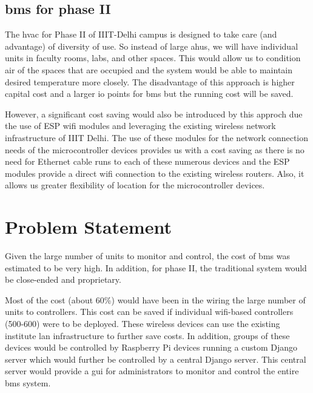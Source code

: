 \documentclass[letterpaper,11pt]{report}
\begin{document}
\section{\ac{bms} for phase II}
The \ac{hvac} for Phase II of IIIT-Delhi campus is designed to take care (and advantage) of diversity of use. So instead of large \ac{ahu}s, we will have individual units in faculty rooms, labs, and other spaces. This would allow us to condition air of the spaces that are occupied and the system would be able to maintain desired temperature more closely. The disadvantage of this approach is higher capital cost and a larger \ac{io} points for \ac{bms} but the running cost will be saved.
\par
However, a significant cost saving would also be introduced by this approch due the use of ESP \ac{wifi} modules and leveraging the existing wireless network infrastructure of IIIT Delhi. The use of these modules for the network connection needs of the microcontroller devices provides us with a cost saving as there is no need for Ethernet cable runs to each of these numerous devices and the ESP modules provide a direct \ac{wifi} connection to the existing wireless routers. Also, it allows us greater flexibility of location for the microcontroller devices.

\newpage
\chapter{Problem Statement}\label{chapter:problemstatement}
\onehalfspacing
Given the large number of units to monitor and control, the cost of \ac{bms} was estimated to be very high. In addition, for phase II, the traditional system would be close-ended and proprietary.
\par
Most of the cost (about 60\%) would have been in the wiring the large number of units to controllers. This cost can be saved if individual \ac{wifi}-based controllers (500-600) were to be deployed. These wireless devices can use the existing institute \ac{lan} infrastructure to further save costs. In addition, groups of these devices would be controlled by Raspberry Pi devices running a custom Django server which would further be controlled by a central Django server. This central server would provide a \ac{gui} for administrators to monitor and control the entire \ac{bms} system.

\newpage
\end{document}
